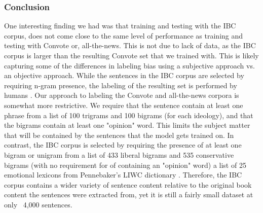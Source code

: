 \documentclass[10pt,a4paper,onecolumn]{article}
\begin{document}
\subsubsection{Conclusion}
One interesting finding we had was that training and testing with the IBC corpus, does not come close to the same level of performance as training and testing with Convote or, all-the-news. This is not due to lack of data, as the IBC corpus is larger than the resulting Convote set that we trained with. This is likely capturing some of the differences in labeling bias using a subjective approach vs. an objective approach. While the sentences in the IBC corpus are selected by requiring n-gram presence, the labeling of the resulting set is performed by humans \cite{iyyerRNN}. Our approach to labeling the Convote and all-the-news corpora is somewhat more restrictive. We require that the sentence contain at least one phrase from a list of 100 trigrams and 100 bigrams (for each ideology), and that the bigrams contain at least one "opinion" word. This limits the subject matter that will be contained by the sentences that the model gets trained on. In contrast, the IBC corpus is selected by requiring the presence of at least one bigram or unigram from a list of 433 liberal bigrams and 535 conservative bigrams (with no requirement for of containing an "opinion" word) a list of 25 emotional lexicons from Pennebaker's LIWC dictionary \cite{YanoBigrams}. Therefore, the IBC corpus contains a wider variety of sentence content relative to the original book content the sentences were extracted from, yet it is still a fairly small dataset at only ~4,000 sentences. 
\end{document}
